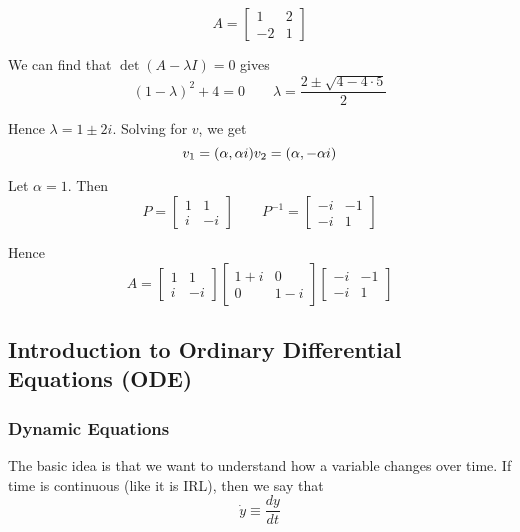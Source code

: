 \documentclass{article}
\begin{document}
\[
  A = \left[\begin{matrix}
      1 & 2 \\ -2 & 1
  \end{matrix}\right]
\]

We can find that $\det(A - \lambda I) = 0$ gives
\[
  (1 - \lambda)^2 + 4 = 0
  \quad\quad
  \lambda = \dfrac{2 \pm \sqrt{4 - 4 \cdot 5}}{2}
\]

Hence $\lambda = 1 \pm 2i$. Solving for $v$, we get
\[
  v_1 = (\alpha, \alpha i)
  \\
  v_2 = (\alpha, -\alpha i)
\]

Let $\alpha = 1$. Then
\[
  P = \left[\begin{matrix}
    1 & 1 \\ i & -i
  \end{matrix}\right]
  \quad\quad
  P^{-1} = \left[\begin{matrix}
    -i & -1 \\ -i & 1
  \end{matrix}\right]
\]

Hence
\[
  A =
  \left[\begin{matrix}
    1 & 1 \\ i & -i
  \end{matrix}\right]
  \left[\begin{matrix}
    1 + i & 0 \\ 0 & 1 - i
  \end{matrix}\right]
  \left[\begin{matrix}
    -i & -1 \\ -i & 1
  \end{matrix}\right]
\]

\subsection{Introduction to Ordinary Differential Equations (ODE)}
\label{sub:introduction_to_ordinary_differential_equations_ode_}

\subsubsection{Dynamic Equations}
\label{ssub:dynamic_equations}

The basic idea is that we want to understand how a variable changes over time. If time is continuous (like it is IRL), then we say that
\[
  \dot{y}
  \equiv
  \dfrac{dy}{dt}
\]
\end{document}
